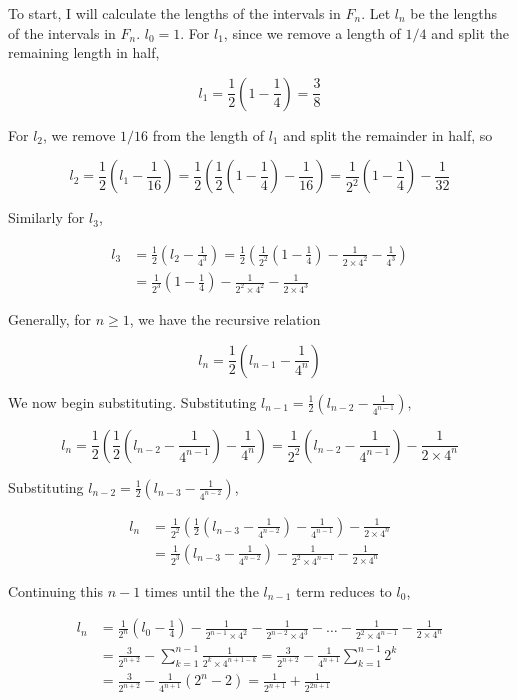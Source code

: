 \documentclass{article}
\begin{document}
To start, I will calculate the lengths of the intervals in $F_n$. Let $l_n$ be the lengths of the intervals in $F_n$. $l_0 = 1$. For $l_1$, since we remove a length of $1/4$ and split the remaining length in half,

\[
l_1 = \frac{1}{2}(1 - \frac{1}{4}) = \frac{3}{8}
\]

For $l_2$, we remove $1/16$ from the  length of $l_1$ and split the remainder in half, so

\[
l_2 = \frac{1}{2}(l_1 - \frac{1}{16})
=
\frac{1}{2}(\frac{1}{2}(1 - \frac{1}{4}) - \frac{1}{16})
=
\frac{1}{2^2}(1-\frac{1}{4}) - \frac{1}{32}
\]

Similarly for $l_3$,

\begin{align*}
l_3 &= 
\frac{1}{2}(l_2 - \frac{1}{4^3})
=
\frac{1}{2}(\frac{1}{2^2}(1-\frac{1}{4}) - \frac{1}{2 \times 4^2} - \frac{1}{4^3}) \\
&=
\frac{1}{2^3}(1-\frac{1}{4}) - \frac{1}{2^2 \times 4^2} - \frac{1}{2 \times 4^3}
\end{align*}

Generally, for $n \geq 1$, we have the recursive relation

\[
l_n = \frac{1}{2}(l_{n-1} - \frac{1}{4^n})
\]

We now begin substituting. Substituting $l_{n-1} = \frac{1}{2}(l_{n-2}- \frac{1}{4^{n-1}})$,

\[
l_n = \frac{1}{2}(\frac{1}{2}(l_{n-2}- \frac{1}{4^{n-1}}) - \frac{1}{4^n})
=
\frac{1}{2^2}(l_{n-2} - \frac{1}{4^{n-1}}) - \frac{1}{2 \times 4^n}
\]

Substituting $l_{n-2} = \frac{1}{2}(l_{n-3} - \frac{1}{4^{n-2}})$,

\begin{align*}
l_n &= 
\frac{1}{2^2}(\frac{1}{2}(l_{n-3} - \frac{1}{4^{n-2}}) - \frac{1}{4^{n-1}}) - \frac{1}{2 \times 4^n} \\
&= \frac{1}{2^3}(l_{n-3} - \frac{1}{4^{n-2}}) - \frac{1}{2^2 \times 4^{n-1}} - \frac{1}{2 \times 4^n}
\end{align*}

Continuing this $n-1$ times until the the $l_{n-1}$ term reduces to $l_0$,

\begin{align*}
l_n &=
\frac{1}{2^n}(l_0 - \frac{1}{4}) - \frac{1}{2^{n-1} \times 4^2} - \frac{1}{2^{n-2} \times 4^3} - \dots - \frac{1}{2^2 \times 4^{n-1}} - \frac{1}{2 \times 4^n} \\
&= \frac{3}{2^{n+2}} - \sum_{k=1}^{n-1} \frac{1}{2^k \times 4^{n+1-k}}
= \frac{3}{2^{n+2}} - \frac{1}{4^{n+1}} \sum_{k=1}^{n-1} 2^k \\
&= \frac{3}{2^{n+2}} - \frac{1}{4^{n+1}}(2^n - 2)
= \frac{1}{2^{n+1}} + \frac{1}{2^{2n+1}}
\end{align*}
\end{document}
